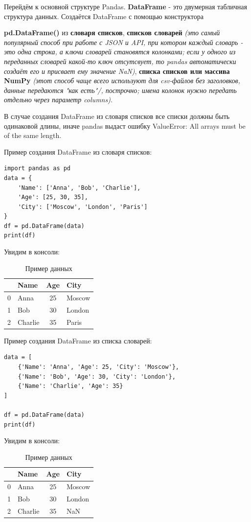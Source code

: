 \documentclass[pract]{SCWorks}
\begin{document}
Перейдём к основной структуре Pandas. \textbf{DataFrame} - это двумерная табличная структура данных.
Создаётся DataFrame с помощью конструктора 

\textbf{pd.DataFrame()} из \textbf{словаря списков}, \textbf{списков словарей} 
\textit{(это самый популярный способ при работе с JSON и API, при котором каждый словарь - это одна строка, а ключи 
словарей становятся колонками; если у одного из переданных словарей какой-то ключ отсутсвует, то pandas автоматически 
создаёт его и присвает ему значение NaN)}, \textbf{списка списков или массива NumPy} \textit{(этот способ чаще всего 
используют для csv-файлов без заголовков, данные передаются "как есть"/, построчно; имена колонок нужно 
передать отдельно через параметр columns)}.

В случае создания DataFrame из словаря списков все списки должны быть одинаковой длины, иначе pandas выдаст 
ошибку ValueError: All arrays must be of the same length.

Пример создания DataFrame из словаря списков:

\begin{verbatim}
import pandas as pd
data = {
    'Name': ['Anna', 'Bob', 'Charlie'],
    'Age': [25, 30, 35],
    'City': ['Moscow', 'London', 'Paris']
}
df = pd.DataFrame(data)
print(df)
\end{verbatim}
Увидим в консоли:

\begin{table}[H]
\centering
\caption{Пример данных}
\begin{tabular}{c l c l }
\hline
 & \textbf{Name} & \textbf{Age} & \textbf{City} \\ \hline
0 & Anna   & 25 & Moscow  \\ \hline
1 & Bob    & 30 & London  \\ \hline
2 & Charlie & 35 & Paris   \\ \hline
\end{tabular}
\end{table}

Пример создания DataFrame из списка словарей:

\begin{verbatim}
data = [
    {'Name': 'Anna', 'Age': 25, 'City': 'Moscow'},
    {'Name': 'Bob', 'Age': 30, 'City': 'London'},
    {'Name': 'Charlie', 'Age': 35}
]

df = pd.DataFrame(data)
print(df)
\end{verbatim}
Увидим в консоли:

\begin{table}[H]
\centering
\caption{Пример данных}
\begin{tabular}{c l c l }
\hline
  & \textbf{Name} & \textbf{Age} & \textbf{City} \\ \hline
0 & Anna   & 25 & Moscow  \\ \hline
1 & Bob    & 30 & London  \\ \hline
2 & Charlie & 35 & NaN   \\ \hline
\end{tabular}
\end{table}
\end{document}
